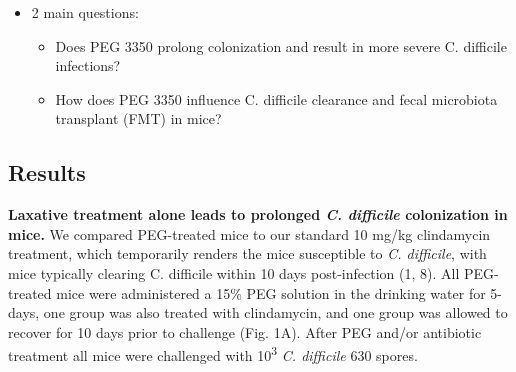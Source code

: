\documentclass[
  11pt,
]{article}
\providecommand{\tightlist}{%
  \setlength{\itemsep}{0pt}\setlength{\parskip}{0pt}}
\begin{document}
\begin{itemize}
\tightlist
\item
  2 main questions:

  \begin{itemize}
  \tightlist
  \item
    Does PEG 3350 prolong colonization and result in more severe C.
    difficile infections?
  \item
    How does PEG 3350 influence C. difficile clearance and fecal
    microbiota transplant (FMT) in mice?
  \end{itemize}
\end{itemize}

\hypertarget{results}{%
\subsection{Results}\label{results}}

\textbf{Laxative treatment alone leads to prolonged \emph{C. difficile}
colonization in mice.} We compared PEG-treated mice to our standard 10
mg/kg clindamycin treatment, which temporarily renders the mice
susceptible to \emph{C. difficile}, with mice typically clearing C.
difficile within 10 days post-infection (1, 8). All PEG-treated mice
were administered a 15\% PEG solution in the drinking water for 5-days,
one group was also treated with clindamycin, and one group was allowed
to recover for 10 days prior to challenge (Fig. 1A). After PEG and/or
antibiotic treatment all mice were challenged with 10\textsuperscript{3}
\emph{C. difficile} 630 spores.
\end{document}
